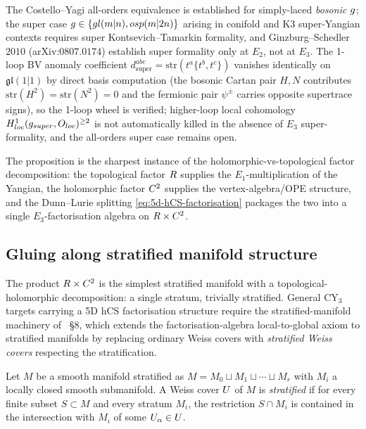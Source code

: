 \begin{remark}
\label{rem:5d-super-hcs-open}
The Costello--Yagi all-orders equivalence is established for
simply-laced \emph{bosonic} $g$; the super case
$g \in \{gl(m|n), osp(m|2n)\}$
arising in conifold and K3 super-Yangian contexts requires super
Kontsevich--Tamarkin formality, and Ginzburg--Schedler~$2010$
(arXiv:$0807.0174$) establish super formality only at $E_2$, not at
$E_3$. The 1-loop BV anomaly coefficient
$d^{abc}_{\mathrm{super}} = \mathrm{str}(t^a \{t^b, t^c\})$ vanishes
identically on $\mathfrak{gl}(1|1)$ by direct basis computation (the
bosonic Cartan pair $H, N$ contributes $\mathrm{str}(H^2) =
\mathrm{str}(N^2) = 0$ and the fermionic pair $\psi^\pm$ carries
opposite supertrace signs), so the 1-loop wheel is verified; higher-loop
local cohomology $H^1_{loc}(g_{super},
O_{loc})^{\ge 2}$ is not automatically killed in
the absence of $E_3$ super-formality, and the all-orders super case
remains open.
\end{remark}

The proposition is the sharpest instance of the
holomorphic-vs-topological factor decomposition: the topological factor
$R$ supplies the $E_1$-multiplication of the Yangian, the holomorphic
factor $C^2$ supplies the vertex-algebra/OPE structure, and the
Dunn--Lurie splitting \eqref{eq:5d-hCS-factorisation} packages the two
into a single $E_3$-factorisation algebra on $R \times C^2$.

\subsection{Gluing along stratified manifold structure}
\label{subsec:fa-stratified-gluing}

The product $R \times C^2$ is the simplest stratified manifold with
a topological-holomorphic decomposition: a single stratum, trivially
stratified. General CY$_3$ targets carrying a 5D hCS factorisation
structure require the stratified-manifold machinery of
\cite{CostelloGwilliam2017}~\S8, which extends the
factorisation-algebra local-to-global axiom to stratified manifolds
by replacing ordinary Weiss covers with \emph{stratified Weiss covers}
respecting the stratification.

\begin{definition}
\label{def:stratified-weiss-cover}
Let $M$ be a smooth manifold stratified as $M = M_0 \sqcup M_1 \sqcup
\cdots \sqcup M_r$ with $M_i$ a locally closed smooth submanifold. A
Weiss cover $U$ of $M$ is \emph{stratified} if for every finite
subset $S \subset M$ and every stratum $M_i$, the restriction
$S \cap M_i$ is contained in the intersection with $M_i$ of some
$U_\alpha \in U$.
\end{definition}

